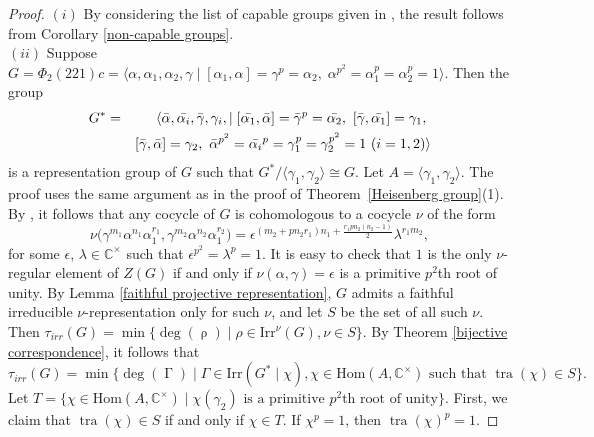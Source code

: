 \documentclass[a4paper,11pt]{amsart}
\numberwithin{equation}{section}
\numberwithin{equation}{subsection}
\newcommand{\C}{\mathbb{C}}
\newcommand{\Hom}{\mathrm{Hom}}
\newcommand{\poonam}[1]{{\color{blue} #1}}
\begin{document}
\begin{proof}

$(i)$ By considering the list of capable groups given in \cite[Table 2]{hatuip5}, the result follows from Corollary \ref{non-capable groups}.  \\

$(ii)$ Suppose $G= \Phi_{2}(221)c =\langle \alpha, \alpha_1, \alpha_2, \gamma \mid [\alpha_1,\alpha] =\gamma^p= \alpha_2,\; \alpha^{p^2}= \alpha_1^{p} = \alpha_2^{p}=1 \rangle$. 
Then the group 
\begin{eqnarray*}
	G^* &=& \langle \Bar{\alpha}, \Bar{\alpha_i}, \Bar{\gamma}, \gamma_i, \mid [\Bar{\alpha_1}, \Bar{\alpha}] = \Bar{\gamma}^p = \Bar{\alpha_2},\ [\Bar{\gamma}, \Bar{\alpha_1}] = \gamma_1,\ \\
	&& [\Bar{\gamma}, \Bar{\alpha}] = \gamma_2,\ \Bar{\alpha}^{p^2}= \Bar{\alpha_i}^{p} = \gamma_1^{p}= \gamma_2^{p^2}= 1 \ (i = 1,2) \rangle  
\end{eqnarray*}
is a representation group of $G$ such that ${G}^*/\langle \gamma_1, \gamma_2 \rangle \cong G$. Let $A= \langle \gamma_1, \gamma_2 \rangle$.
The proof uses the same argument as in the proof of Theorem~\ref{Heisenberg group}(1).
By \cite[Theorem 9.4]{Mackey}, it follows that any cocycle of $G$ is cohomologous to a cocycle $\nu$ of the form
$$
\nu\big(\gamma^{m_1}\alpha^{n_1}\alpha_1^{r_1}, \gamma^{m_2}\alpha^{n_2}\alpha_1^{r_2}\big) = \epsilon^{(m_2+p n_2r_1)n_1+\frac{r_1pn_2(n_2-1)}{2}}\lambda^{r_1m_2},
$$ for some $\epsilon$, $\lambda \in \C^\times$ such that $\epsilon^{p^2}= \lambda^{p}= 1$. It is easy to check that $1$ is the only $\nu$-regular element of $Z(G)$ if and only if $\nu(\alpha, \gamma)= \epsilon$ is a primitive $p^2$th root of unity. By Lemma \ref{faithful projective representation}, $G$ admits a faithful irreducible $\nu$-representation only for such $\nu$, and let $S$ be the set of all such $\nu$. Then $\tau_{irr}(G)= \operatorname{min}\{\operatorname{deg}(\operatorname{\rho}) \mid \rho \in \mathrm{Irr}^\nu(G), \nu \in S\}$. By Theorem \ref{bijective correspondence}, it follows that $$\tau_{irr}(G)=\operatorname{min}\{\operatorname{deg}(\operatorname{\Gamma}) \mid \Gamma \in \mathrm{Irr}(G^*\mid \chi), \chi\in \Hom(A, \C^\times) \text{ such that } \operatorname{tra}(\chi) \in S\}.$$ 
Let $T= \{\chi\in \Hom(A, \C^\times)\mid \chi(\gamma_2) \text{ is a primitive } p^2 \text{th root of unity}\}.$
First, we claim that $\operatorname{tra}(\chi) \in S$ if and only if $\chi\in T$. If $\chi^p= 1$, then $\operatorname{tra}(\chi)^p= 1$.  

\end{proof}
\end{document}
